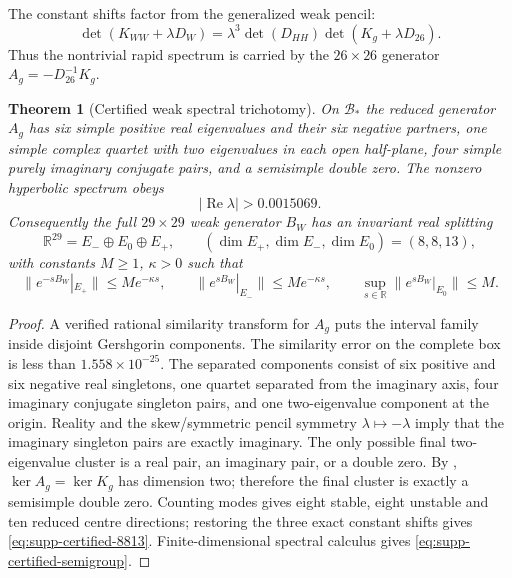 \documentclass[11pt]{article}
\newtheorem{theorem}{Theorem}[section]
\numberwithin{equation}{section}
\theoremstyle{definition}
\theoremstyle{remark}
\begin{document}
The constant shifts factor from the generalized weak pencil:
\begin{equation}
 \det(K_{WW}+\lambda D_W)
 =\lambda^3\det(D_{HH})\det(K_g+\lambda D_{26}).
 \label{eq:supp-certified-pencil-factor}
\end{equation}
Thus the nontrivial rapid spectrum is carried by the $26\times26$ generator
$A_g=-D_{26}^{-1}K_g$.

\begin{theorem}[Certified weak spectral trichotomy]
\label{thm:supp-certified-rapid-spectrum}
On $\mathcal B_*$ the reduced generator $A_g$ has six simple positive real
eigenvalues and their six negative partners, one simple complex quartet with
two eigenvalues in each open half-plane, four simple purely imaginary
conjugate pairs, and a semisimple double zero.  The nonzero hyperbolic
spectrum obeys
\begin{equation}
 |\operatorname{Re}\lambda|>0.0015069.
 \label{eq:supp-certified-hyperbolic-gap}
\end{equation}
Consequently the full $29\times29$ weak generator $B_W$ has an invariant
real splitting
\begin{equation}
 \mathbb R^{29}=E_-\oplus E_0\oplus E_+,
 \qquad(\dim E_+,\dim E_-,\dim E_0)=(8,8,13),
 \label{eq:supp-certified-8813}
\end{equation}
with constants $M\ge1$, $\kappa>0$ such that
\begin{equation}
 \|e^{-sB_W}|_{E_+}\|\le Me^{-\kappa s},\qquad
 \|e^{sB_W}|_{E_-}\|\le Me^{-\kappa s},\qquad
 \sup_{s\in\mathbb R}\|e^{sB_W}|_{E_0}\|\le M.
 \label{eq:supp-certified-semigroup}
\end{equation}
\end{theorem}
\begin{proof}
A verified rational similarity transform for $A_g$ puts the interval family
inside disjoint Gershgorin components.  The similarity error on the complete
box is less than $1.558\times10^{-25}$.  The separated components consist of
six positive and six negative real singletons, one quartet separated from the
imaginary axis, four imaginary conjugate singleton pairs, and one
two-eigenvalue component at the origin.  Reality and the skew/symmetric pencil
symmetry $\lambda\mapsto-\lambda$ imply that the imaginary singleton pairs
are exactly imaginary.  The only possible final two-eigenvalue cluster is a
real pair, an imaginary pair, or a double zero.  By
, $\ker A_g=\ker K_g$ has dimension two;
therefore the final cluster is exactly a semisimple double zero.  Counting
modes gives eight stable, eight unstable and ten reduced centre directions;
restoring the three exact constant shifts gives
\eqref{eq:supp-certified-8813}.  Finite-dimensional spectral calculus gives
\eqref{eq:supp-certified-semigroup}.
\end{proof}
\end{document}
